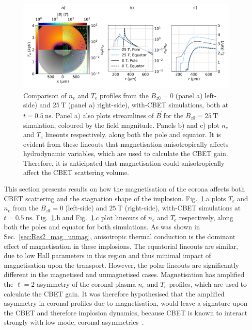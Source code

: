 \begin{figure}[t!]
    \includegraphics[width=\linewidth]{Results2/Images/ne_te_Bstream_comp_alt050.png}
    \centering
    \caption{Comparison of $n_e$ and $T_e$ profiles from the $B_{z0}=0$ (panel a) left-side) and $25\ \text{T}$ (panel a) right-side), with-\ac{CBET} simulations, both at $t=0.5\ \text{ns}$.
    Panel a) also plots streamlines of $\vec{B}$ for the $B_{z0}=25\ \text{T}$ simulation, coloured by the field magnitude.
    Panels b) and c) plot $n_e$ and $T_e$ lineouts respectively, along both the pole and equator.
    It is evident from these lineouts that magnetisation anisotropically affects hydrodynamic variables, which are used to calculate the \ac{CBET} gain.
    Therefore, it is anticipated that magnetisation could anisotropically affect the \ac{CBET} scattering volume.}%
    \label{fig:Res2_ne_te_Bstream_comp_alt050}
\end{figure}

This section presents results on how the magnetisation of the corona affects both \ac{CBET} scattering and the stagnation shape of the implosion.
Fig.~\ref{fig:Res2_ne_te_Bstream_comp_alt050}.a plots $T_e$ and $n_e$ from the $B_{z0}=0$ (left-side) and $25\ \text{T}$ (right-side), with-\ac{CBET} simulations at $t=0.5\ \text{ns}$.
Fig.~\ref{fig:Res2_ne_te_Bstream_comp_alt050}.b and Fig.~\ref{fig:Res2_ne_te_Bstream_comp_alt050}.c plot lineouts of $n_e$ and $T_e$ respectively, along both the poles and equator for both simulations.
As was shown in Sec.~\ref{sec:Res2_mag_unmag}, anisotropic thermal conduction is the dominant effect of magnetisation in these implosions.
The equatorial lineouts are similar, due to low Hall parameters in this region and thus minimal impact of magnetisation upon the transport.
However, the polar lineouts are significantly different in the magnetised and unmagnetised cases.
Magnetisation has amplified the $\ell=2$ asymmetry of the coronal plasma $n_e$ and $T_e$ profiles, which are used to calculate the \ac{CBET} gain.
It was therefore hypothesised that the amplified asymmetry in coronal profiles due to magnetisation, would leave a signature upon the \ac{CBET} and therefore implosion dynamics, because \ac{CBET} is known to interact strongly with low mode, coronal asymmetries~\cite{anderson_effect_2020}.


